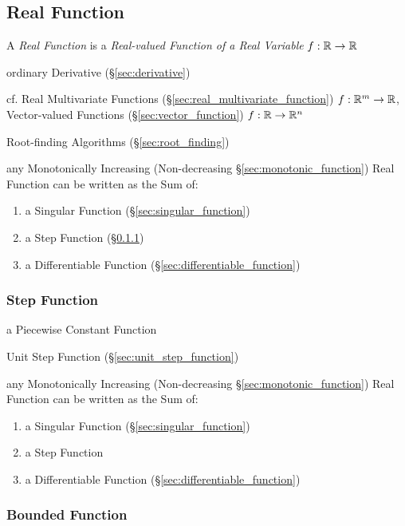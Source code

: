 \subsection{Real Function}\label{sec:real_function}

A \emph{Real Function} is a \emph{Real-valued Function of a Real Variable}
$f : \mathbb{R} \rightarrow \mathbb{R}$

ordinary Derivative (\S\ref{sec:derivative})

\fist cf. Real Multivariate Functions (\S\ref{sec:real_multivariate_function})
$f : \mathbb{R}^m \rightarrow \mathbb{R}$,
Vector-valued Functions (\S\ref{sec:vector_function}) $f : \mathbb{R} \rightarrow
\mathbb{R}^n$

\fist Root-finding Algorithms (\S\ref{sec:root_finding})

any Monotonically Increasing (Non-decreasing \S\ref{sec:monotonic_function})
Real Function can be written as the Sum of:
\begin{enumerate}
  \item a Singular Function (\S\ref{sec:singular_function})
  \item a Step Function (\S\ref{sec:step_function})
  \item a Differentiable Function (\S\ref{sec:differentiable_function})
\end{enumerate}



\subsubsection{Step Function}\label{sec:step_function}

a Piecewise Constant Function

Unit Step Function (\S\ref{sec:unit_step_function})

any Monotonically Increasing (Non-decreasing \S\ref{sec:monotonic_function})
Real Function can be written as the Sum of:
\begin{enumerate}
  \item a Singular Function (\S\ref{sec:singular_function})
  \item a Step Function
  \item a Differentiable Function (\S\ref{sec:differentiable_function})
\end{enumerate}



\subsubsection{Bounded Function}\label{sec:bounded_function}

